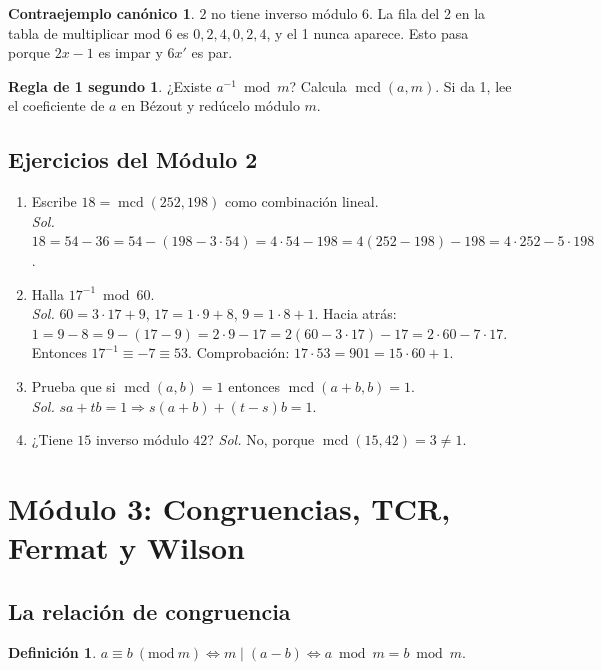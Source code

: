 \documentclass[11pt,a4paper]{article}
\theoremstyle{definition}
\newtheorem{definicion}[teorema]{Definición}
\newcommand{\md}[1]{\ (\mathrm{mod}\ #1)}
\newcommand{\mcd}{\operatorname{mcd}}
\theoremstyle{notait}
\theoremstyle{nota}
\newtheorem*{contra}{Contraejemplo canónico}
\newtheorem*{regla}{Regla de 1 segundo}
\begin{document}
\begin{contra}
$2$ no tiene inverso módulo $6$. La fila del 2 en la tabla de multiplicar mod 6 es $0,2,4,0,2,4$, y el 1 nunca aparece. Esto pasa porque $2x-1$ es impar y $6x'$ es par.
\end{contra}

\begin{regla}
¿Existe $a^{-1}\bmod m$? Calcula $\mcd(a,m)$. Si da 1, lee el coeficiente de $a$ en Bézout y redúcelo módulo $m$.
\end{regla}

\subsection*{Ejercicios del Módulo 2}
\begin{enumerate}[label=\textbf{2.\arabic*}]
\item Escribe $18=\mcd(252,198)$ como combinación lineal.\\
\emph{Sol.} $18=54-36=54-(198-3\cdot54)=4\cdot54-198=4(252-198)-198=4\cdot252-5\cdot198$.
\item Halla $17^{-1}\bmod 60$.\\
\emph{Sol.} $60=3\cdot17+9$, $17=1\cdot9+8$, $9=1\cdot8+1$. Hacia atrás: $1=9-8=9-(17-9)=2\cdot9-17=2(60-3\cdot17)-17=2\cdot60-7\cdot17$. Entonces $17^{-1}\equiv-7\equiv53$. Comprobación: $17\cdot53=901=15\cdot60+1$.
\item Prueba que si $\mcd(a,b)=1$ entonces $\mcd(a+b,b)=1$.\\
\emph{Sol.} $sa+tb=1\Rightarrow s(a+b)+(t-s)b=1$.
\item ¿Tiene $15$ inverso módulo $42$? \emph{Sol.} No, porque $\mcd(15,42)=3\neq1$.
\end{enumerate}

\newpage
\section{Módulo 3: Congruencias, TCR, Fermat y Wilson}

\subsection{La relación de congruencia}

\begin{definicion}
$a\equiv b\md m\iff m\mid(a-b)\iff a\bmod m=b\bmod m$.
\end{definicion}
\end{document}
